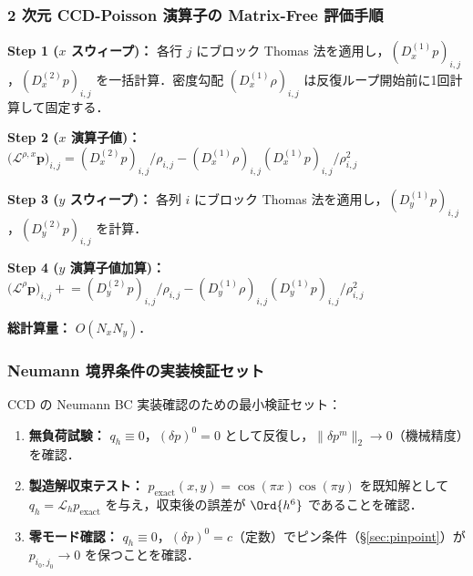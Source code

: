 \subsubsection{2 次元 CCD-Poisson 演算子の Matrix-Free 評価手順}
\label{sec:ccd_matrix_free_eval}

\begin{tcolorbox}[algbox, title={2次元 CCD-Poisson 演算子の Matrix-Free 評価手順}]
\textbf{Step 1 ($x$ スウィープ)：} 各行 $j$ にブロック Thomas 法を適用し，$(D_x^{(1)}p)_{i,j}$，$(D_x^{(2)}p)_{i,j}$ を一括計算．密度勾配 $(D_x^{(1)}\rho)_{i,j}$ は反復ループ開始前に1回計算して固定する．

\textbf{Step 2 ($x$ 演算子値)：}
$\bigl(\mathcal{L}^{\rho,x}\bm{p}\bigr)_{i,j}
  = (D_x^{(2)}p)_{i,j}/\rho_{i,j} - (D_x^{(1)}\rho)_{i,j}(D_x^{(1)}p)_{i,j}/\rho_{i,j}^2$

\textbf{Step 3 ($y$ スウィープ)：} 各列 $i$ にブロック Thomas 法を適用し，$(D_y^{(1)}p)_{i,j}$，$(D_y^{(2)}p)_{i,j}$ を計算．

\textbf{Step 4 ($y$ 演算子値加算)：}
$\bigl(\mathcal{L}^{\rho}\bm{p}\bigr)_{i,j} \mathrel{+}= (D_y^{(2)}p)_{i,j}/\rho_{i,j} - (D_y^{(1)}\rho)_{i,j}(D_y^{(1)}p)_{i,j}/\rho_{i,j}^2$

\textbf{総計算量：} $O(N_x N_y)$．
\end{tcolorbox}

\subsubsection{Neumann 境界条件の実装検証セット}
\label{sec:ccd_neumann_unit_test}

CCD の Neumann BC 実装確認のための最小検証セット：
\begin{enumerate}
  \item \textbf{無負荷試験：} $q_h \equiv 0$，$(\delta p)^0 = 0$ として反復し，$\|\delta p^m\|_2 \to 0$（機械精度）を確認．
  \item \textbf{製造解収束テスト：} $p_\text{exact}(x,y) = \cos(\pi x)\cos(\pi y)$ を既知解として $q_h = \mathcal{L}_h p_\text{exact}$ を与え，収束後の誤差が $\Ord{h^6}$ であることを確認．
  \item \textbf{零モード確認：} $q_h \equiv 0$，$(\delta p)^0 = c$（定数）でピン条件（§\ref{sec:pinpoint}）が $p_{i_0,j_0} \to 0$ を保つことを確認．
\end{enumerate}
